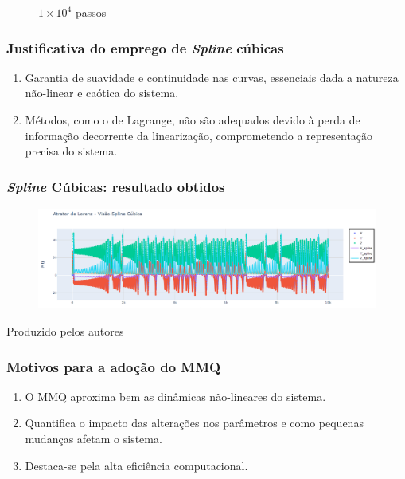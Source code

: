 \begin{frame}
\begin{figure}[htbp]
\begin{minipage}{0.32\textwidth}
            \vspace{0.5em} %
            {\scriptsize $1 \times 10^4$ passos}
        \end{minipage}
    \end{figure}
\end{frame}



\begin{frame}
    \frametitle{Justificativa do emprego de \textit{Spline} cúbicas}
    \begin{enumerate}
        \item Garantia de suavidade e continuidade nas curvas, essenciais dada a natureza não-linear e caótica do sistema. 
        \item Métodos, como o de Lagrange, não são adequados devido à perda de informação decorrente da linearização, comprometendo a representação precisa do sistema.
    \end{enumerate}
\end{frame}


\begin{frame}
    \frametitle{\textit{Spline} Cúbicas: resultado obtidos}      
    
    \begin{figure}
        \centering
        \includegraphics[width=1.0\textwidth]{01_docs/00_Relatorio/img/spline.png}
    \end{figure}

    \vspace{0.2cm}

    \begin{center}
        {\tiny Produzido pelos autores}
    \end{center}
    
\end{frame}

\begin{frame}
    \frametitle{Motivos para a adoção do MMQ}
    \begin{enumerate}
        \item O MMQ aproxima bem as dinâmicas não-lineares do sistema.
        \item Quantifica o impacto das alterações nos parâmetros e como pequenas mudanças afetam o sistema.
        \item Destaca-se pela alta eficiência computacional.
    \end{enumerate}
\end{frame}

